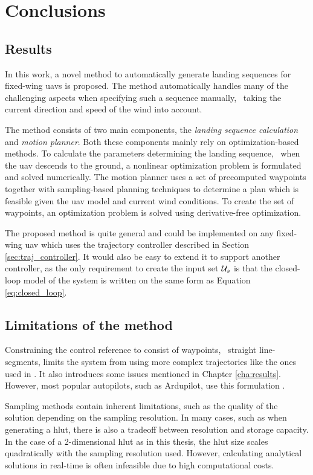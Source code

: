 \chapter{Conclusions}\label{cha:discussion}
\section{Results}
In this work, a novel method to automatically generate landing sequences for fixed-wing \acp{uav} is proposed. 
The method automatically handles many of the challenging aspects when specifying such a sequence manually, \eg\ taking the current 
direction and speed of the wind into account.

The method consists of two main components, the \textit{landing sequence calculation} and \textit{motion planner}. Both these components mainly rely on optimization-based methods. 
To calculate the parameters determining the landing sequence, \ie\ when the \ac{uav} descends to the ground, a nonlinear optimization problem is 
formulated and solved numerically. The motion planner uses a set of precomputed waypoints together with sampling-based planning techniques to determine a plan which is feasible given the 
\ac{uav} model and current wind conditions. To create the set of waypoints, an optimization problem is solved using derivative-free optimization.

The proposed method is quite general and could be implemented on any fixed-wing \ac{uav} which uses the trajectory controller described in Section \ref{sec:traj_controller}. 
It would also be easy to extend it to support another controller, as the only requirement to create the input set $\mathcal{U}_s$ is that the closed-loop model of the system is written on the same form as 
Equation \eqref{eq:closed_loop}.

\section{Limitations of the method}
Constraining the control reference to consist of waypoints, \ie\ straight line-seg\-ments, limits the system from using more complex trajectories like the ones used in \cite{emergency_landing}. It also introduces some issues mentioned in Chapter \ref{cha:results}. 
However, most popular autopilots, such as Ardupilot, use this formulation \cite{arduplane}. 

Sampling methods contain inherent limitations, such as the 
quality of the solution depending on the sampling resolution. In many cases, such as when generating a \ac{hlut}, there is also a tradeoff between resolution and storage capacity. In the case of a 2-dimensional \ac{hlut} as in this thesis, the \ac{hlut} size scales quadratically with the sampling resolution used. 
However, calculating analytical solutions in real-time is often infeasible due to high computational costs.

